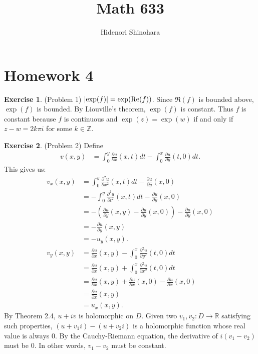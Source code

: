 \documentclass[12pt, psamsfonts]{amsart}
\theoremstyle{definition}
\newtheorem*{exer}{Exercise}
\theoremstyle{remark}
\numberwithin{equation}{section}
\begin{document}
\title{Math 633}
\author{Hidenori Shinohara}
\maketitle

\section{Homework 4}

\begin{exer}{(Problem 1)}
  $\abs{\exp(f)} = \exp(\Re(f))$.
  Since $\Re(f)$ is bounded above, $\exp(f)$ is bounded.
  By Liouville's theorem, $\exp(f)$ is constant.
  Thus $f$ is constant because $f$ is continuous and $\exp(z) = \exp(w)$ if and only if $z - w = 2k\pi i$ for some $k \in \mathbb{Z}$.
\end{exer}

\begin{exer}{(Problem 2)}
  Define
  \begin{align*}
    v(x, y) &= \int_{0}^{y} \frac{\partial u}{\partial x}(x, t) dt - \int_{0}^{x} \frac{\partial u}{\partial y}(t, 0) dt.
  \end{align*}
  This gives us:
  \begin{align*}
    v_x(x, y)
      &= \int_{0}^{y} \frac{\partial^2 u}{\partial x^2}(x, t) dt - \frac{\partial u}{\partial y}(x, 0) \\
      &= -\int_{0}^{y} \frac{\partial^2 u}{\partial t^2}(x, t) dt - \frac{\partial u}{\partial y}(x, 0) \\
      &= -(\frac{\partial u}{\partial y}(x, y) - \frac{\partial u}{\partial y}(x, 0)) - \frac{\partial u}{\partial y}(x, 0) \\
      &= -\frac{\partial u}{\partial y}(x, y) \\
      &= -u_y(x, y). \\
    v_y(x, y)
      &= \frac{\partial u}{\partial x}(x, y) - \int_0^x \frac{\partial^2 u}{\partial y^2}(t, 0) dt \\
      &= \frac{\partial u}{\partial x}(x, y) + \int_0^x \frac{\partial^2 u}{\partial x^2}(t, 0) dt \\
      &= \frac{\partial u}{\partial x}(x, y) + \frac{\partial u}{\partial x}(x, 0) - \frac{\partial u}{\partial x}(x, 0) \\
      &= \frac{\partial u}{\partial x}(x, y) \\
      &= u_x(x, y).
  \end{align*}
  By Theorem 2.4, $u + iv$ is holomorphic on $D$.
  Given two $v_1, v_2:D \rightarrow \mathbb{R}$ satisfying such properties, $(u + v_1i) - (u + v_2i)$ is a holomorphic function whose real value is always 0.
  By the Cauchy-Riemann equation, the derivative of $i(v_1 - v_2)$ must be 0.
  In other words, $v_1 - v_2$ must be constant.
\end{exer}
\end{document}
